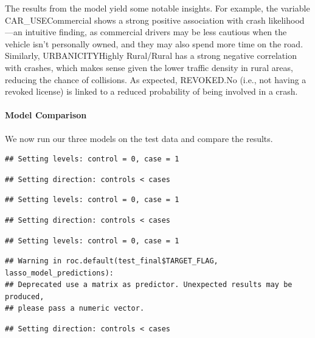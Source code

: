 \documentclass[
]{article}
\begin{document}
The results from the model yield some notable insights. For example, the
variable CAR\_USECommercial shows a strong positive association with
crash likelihood---an intuitive finding, as commercial drivers may be
less cautious when the vehicle isn't personally owned, and they may also
spend more time on the road. Similarly, URBANICITYHighly Rural/Rural has
a strong negative correlation with crashes, which makes sense given the
lower traffic density in rural areas, reducing the chance of collisions.
As expected, REVOKED.No (i.e., not having a revoked license) is linked
to a reduced probability of being involved in a crash.

\paragraph{Model Comparison}\label{model-comparison}

We now run our three models on the test data and compare the results.

\begin{verbatim}
## Setting levels: control = 0, case = 1
\end{verbatim}

\begin{verbatim}
## Setting direction: controls < cases
\end{verbatim}

\begin{verbatim}
## Setting levels: control = 0, case = 1
\end{verbatim}

\begin{verbatim}
## Setting direction: controls < cases
\end{verbatim}

\begin{verbatim}
## Setting levels: control = 0, case = 1
\end{verbatim}

\begin{verbatim}
## Warning in roc.default(test_final$TARGET_FLAG, lasso_model_predictions):
## Deprecated use a matrix as predictor. Unexpected results may be produced,
## please pass a numeric vector.
\end{verbatim}

\begin{verbatim}
## Setting direction: controls < cases
\end{verbatim}
\end{document}
